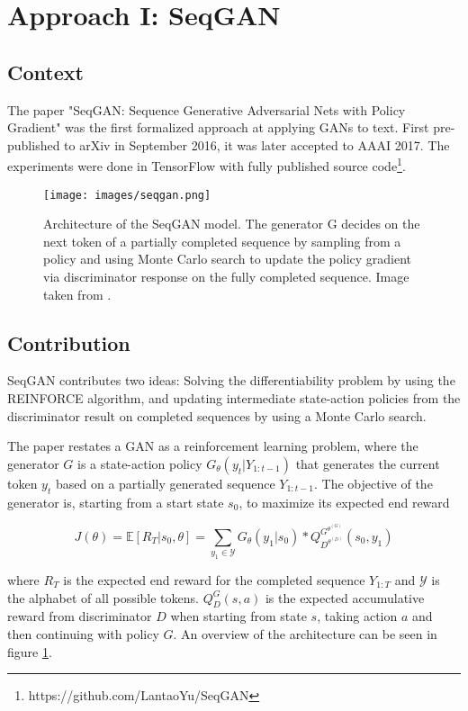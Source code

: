 \documentclass[a4paper,conference]{IEEEtran}
\begin{document}
\section{Approach I: SeqGAN}

\subsection{Context}

The paper "SeqGAN: Sequence Generative Adversarial Nets with Policy Gradient" \cite{c7} was the first formalized approach at applying GANs to text. First pre-published to arXiv in September 2016, it was later accepted to AAAI 2017. The experiments were done in TensorFlow \cite{c6} with fully published source code\footnote{https://github.com/LantaoYu/SeqGAN}.

   \begin{figure}[thpb]
      \centering
      \texttt{[image: images/seqgan.png]}
      \caption{Architecture of the SeqGAN model. The generator G decides on the next token of a partially completed sequence by sampling from a policy and using Monte Carlo search to update the policy gradient via discriminator response on the fully completed sequence. Image taken from \cite{c7}.}
      \label{fig:seqgan}
   \end{figure}

\subsection{Contribution}
SeqGAN contributes two ideas: Solving the differentiability problem by using the REINFORCE algorithm, and updating intermediate state-action policies from the discriminator result on completed sequences by using a Monte Carlo search.

The paper restates a GAN as a reinforcement learning problem, where the generator $G$ is a state-action policy $G_\theta(y_t|Y_{1:t-1})$ that generates the current token $y_t$ based on a partially generated sequence $Y_{1:t-1}$. The objective of the generator is, starting from a start state $s_0$, to maximize its expected end reward

\begin{dmath}
J(\theta) = \mathbb{E}[R_T|s_0, \theta] = \sum_{y_1 \in \mathcal{Y}}G_\theta(y_1|s_0)*Q_{D^{\theta^{(D)}}}^{G^{\theta^{(G)}}}(s_0, y_1)
\end{dmath}

where $R_T$ is the expected end reward for the completed sequence $Y_{1:T}$ and $\mathcal{Y}$ is the alphabet of all possible tokens. $Q_{D}^{G}(s, a)$ is the expected accumulative reward from discriminator $D$ when starting from state $s$, taking action $a$ and then continuing with policy $G$. An overview of the architecture can be seen in figure \ref{fig:seqgan}.
\end{document}
